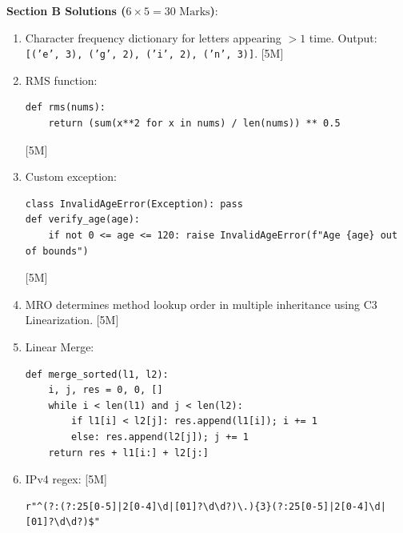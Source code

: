 \begin{solutionbox}
\medskip
\noindent\textbf{Section B Solutions ($6 \times 5 = 30\text{ Marks}$)}:
\begin{enumerate}[start=11]
    \item Character frequency dictionary for letters appearing $>1$ time. Output: \texttt{[('e', 3), ('g', 2), ('i', 2), ('n', 3)]}. [5M]
    \item RMS function:
    \begin{lstlisting}[language=Python3]
def rms(nums):
    return (sum(x**2 for x in nums) / len(nums)) ** 0.5
    \end{lstlisting} [5M]
    \item Custom exception:
    \begin{lstlisting}[language=Python3]
class InvalidAgeError(Exception): pass
def verify_age(age):
    if not 0 <= age <= 120: raise InvalidAgeError(f"Age {age} out of bounds")
    \end{lstlisting} [5M]
    \item MRO determines method lookup order in multiple inheritance using C3 Linearization. [5M]
    \item Linear Merge:
    \begin{lstlisting}[language=Python3]
def merge_sorted(l1, l2):
    i, j, res = 0, 0, []
    while i < len(l1) and j < len(l2):
        if l1[i] < l2[j]: res.append(l1[i]); i += 1
        else: res.append(l2[j]); j += 1
    return res + l1[i:] + l2[j:]
    \end{lstlisting}
    \item IPv4 regex: [5M]
    \begin{lstlisting}[language=Python3]
r"^(?:(?:25[0-5]|2[0-4]\d|[01]?\d\d?)\.){3}(?:25[0-5]|2[0-4]\d|[01]?\d\d?)$"
    \end{lstlisting}
\end{enumerate}


\end{solutionbox}
